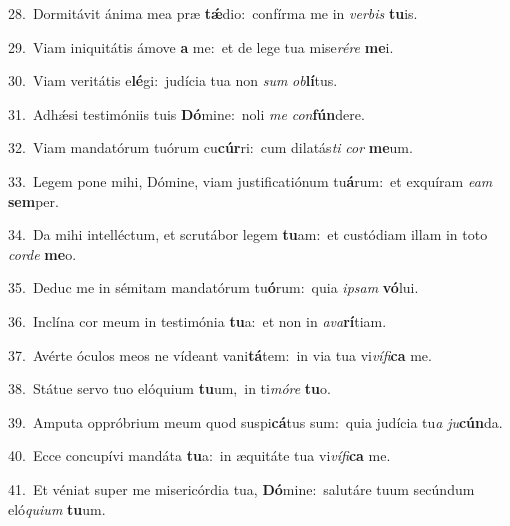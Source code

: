 {\numbfont\textcolor{\numbcolor}{28.}}~Dormitávit ánima mea præ \textbf{tǽ}\-dio:~\star confírma me in \textit{ver}\-\textit{bis} \textbf{tu}\-is.\par
{\numbfont\textcolor{\numbcolor}{29.}}~Viam iniquitátis ámove \textbf{a} me:~\star et de lege tua mise\-\textit{ré}\-\textit{re} \textbf{me}\-i.\par
{\numbfont\textcolor{\numbcolor}{30.}}~Viam veritátis e\-\textbf{lé}\-gi:~\star judícia tua non \textit{sum} \textit{ob}\-\textbf{lí}tus.\par
{\numbfont\textcolor{\numbcolor}{31.}}~Adhǽsi testimóniis tuis \textbf{Dó}\-mine:~\star noli \textit{me} \textit{con}\-\textbf{fún}dere.\par
{\numbfont\textcolor{\numbcolor}{32.}}~Viam mandatórum tuórum cu\-\textbf{cúr}\-ri:~\star cum dilatás\textit{ti} \textit{cor} \textbf{me}\-um.\par
{\numbfont\textcolor{\numbcolor}{33.}}~Legem pone mihi, Dómine, viam justificatiónum tu\-\textbf{á}\-rum:~\star et exquíram \textit{e}\-\textit{am} \textbf{sem}\-per.\par
{\numbfont\textcolor{\numbcolor}{34.}}~Da mihi intelléctum, et scrutábor legem \textbf{tu}\-am:~\star et custódiam illam in toto \textit{cor}\-\textit{de} \textbf{me}\-o.\par
{\numbfont\textcolor{\numbcolor}{35.}}~Deduc me in sémitam mandatórum tu\-\textbf{ó}\-rum:~\star quia \textit{ip}\-\textit{sam} \textbf{vó}\-lui.\par
{\numbfont\textcolor{\numbcolor}{36.}}~Inclína cor meum in testimónia \textbf{tu}\-a:~\star et non in \textit{a}\-\textit{va}\textbf{rí}tiam.\par
{\numbfont\textcolor{\numbcolor}{37.}}~Avérte óculos meos ne vídeant vani\-\textbf{tá}\-tem:~\star in via tua vi\-\textit{ví}\-\textit{fi}\textbf{ca} me.\par
{\numbfont\textcolor{\numbcolor}{38.}}~Státue servo tuo elóquium \textbf{tu}\-um,~\star in ti\-\textit{mó}\-\textit{re} \textbf{tu}\-o.\par
{\numbfont\textcolor{\numbcolor}{39.}}~Amputa oppróbrium meum quod suspi\-\textbf{cá}\-tus sum:~\star quia judícia tu\textit{a} \textit{ju}\-\textbf{cún}da.\par
{\numbfont\textcolor{\numbcolor}{40.}}~Ecce concupívi mandáta \textbf{tu}\-a:~\star in æquitáte tua vi\-\textit{ví}\-\textit{fi}\textbf{ca} me.\par
{\numbfont\textcolor{\numbcolor}{41.}}~Et véniat super me misericórdia tua, \textbf{Dó}\-mine:~\star salutáre tuum secúndum eló\-\textit{qui}\-\textit{um} \textbf{tu}\-um.\par
